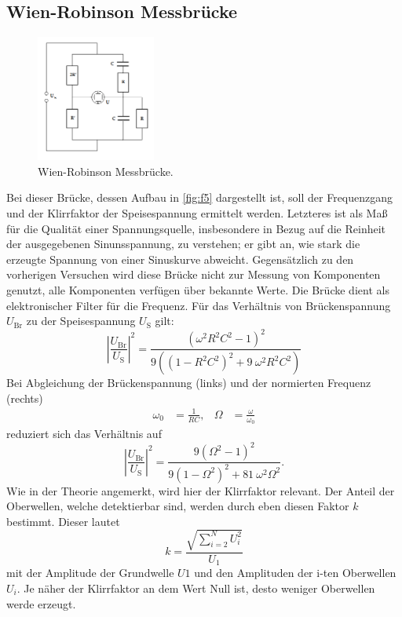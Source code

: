 \subsection{Wien-Robinson Messbrücke}
\begin{figure}[H]
    \centering
        \centering
        \includegraphics[width=0.35\textwidth]{Bilder/wien_robinson.png}
        \caption{Wien-Robinson Messbrücke. \cite{anleitung}}
    \hfill
    \label{fig:f5}
\end{figure}
Bei dieser Brücke, dessen Aufbau in \autoref{fig:f5} dargestellt ist, soll der 
Frequenzgang und der Klirrfaktor der Speisespannung ermittelt werden. Letzteres 
ist als Maß für die Qualität einer Spannungsquelle, insbesondere in Bezug auf 
die Reinheit der ausgegebenen Sinunsspannung, zu verstehen; er gibt an, wie 
stark die erzeugte Spannung von einer Sinuskurve abweicht. Gegensätzlich zu 
den vorherigen Versuchen wird diese Brücke nicht zur Messung von Komponenten 
genutzt, alle Komponenten verfügen über bekannte Werte. Die Brücke dient als 
elektronischer Filter für die Frequenz. Für das Verhältnis von Brückenspannung 
$U_{\text{Br}}$ zu der Speisespannung $U_{\text{S}}$ gilt:
\begin{equation}
    \left|\frac{U_{\text{Br}}}{U_{\text{S}}}\right|^2 = \frac{(\omega ^2 R^2 C^2 -1)^2}{9((1-R^2 C^2)^2+9 \: \omega ^2 R^2 C^2)}
\end{equation}
Bei Abgleichung der Brückenspannung (links) und der normierten Frequenz (rechts)
\begin{equation}
    \begin{aligned}
        \omega_0 &= \frac{1}{RC}, & \Omega &= \frac{\omega}{\omega_0}
    \end{aligned}
\end{equation}
reduziert sich das Verhältnis auf 
\begin{equation}
    \label{eqn:omega}
    \left|\frac{U_{\text{Br}}}{U_{\text{S}}}\right|^2 = \frac{9(\Omega ^2 -1)^2}{9(1-\Omega^2)^2+81 \: \omega ^2 \Omega^2}.
\end{equation}
Wie in der Theorie angemerkt, wird hier der Klirrfaktor relevant. Der Anteil der 
Oberwellen, welche detektierbar sind, werden durch eben diesen Faktor $k$ bestimmt. 
Dieser lautet
\begin{equation}
    \label{eqn:Klirrfaktor}
    k = \frac{\sqrt{\sum\limits_{i=2}^N U_i^2}}{U_1}
\end{equation}
mit der Amplitude der Grundwelle $U1$ und den Amplituden der i-ten Oberwellen 
$U_i$. Je näher der Klirrfaktor an dem Wert Null ist, desto weniger Oberwellen 
werde erzeugt.